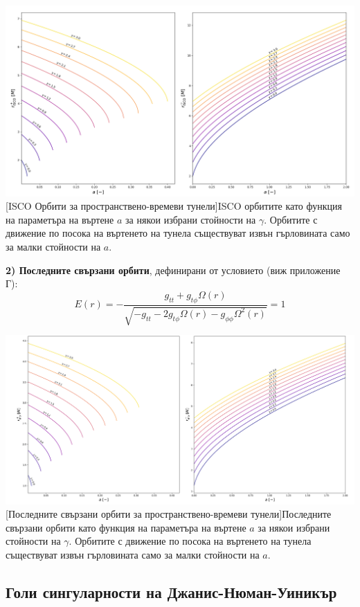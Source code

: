 \includegraphics[scale = 0.35]{WH_ISCO.png}
[ISCO Орбити за пространствено-времеви тунели]{\small ISCO орбитите като функция на параметъра на въртене $a$ за някои избрани стойности на $\gamma$. Орбитите с движение по посока на въртенето на тунела съществуват извън гърловината само за малки стойности на $a$.}
\label{WH_ISCO}

$ $\newline\textbf{2) Последните свързани орбити}, дефинирани от условието (виж приложение Г):
\begin{equation}
	E(r) = -\frac{g_{tt} + g_{t\phi}\Omega(r)}{\sqrt{-g_{tt} - 2g_{t\phi}\Omega(r) - g_{\phi\phi}\Omega^2(r)}} = 1
\end{equation}

\hspace{-0.5cm}
\includegraphics[scale = 0.3]{WH_mb.png}
[Последните свързани орбити за пространствено-времеви тунели]{\small Последните свързани орбити като функция на параметъра на въртене $a$ за някои избрани стойности на $\gamma$. Орбитите с движение по посока на въртенето на тунела съществуват извън гърловината само за малки стойности на $a$.}
\label{WH_mb}

\newpage
\subsection{Голи сингуларности на Джанис-Нюман-Уиникър}

